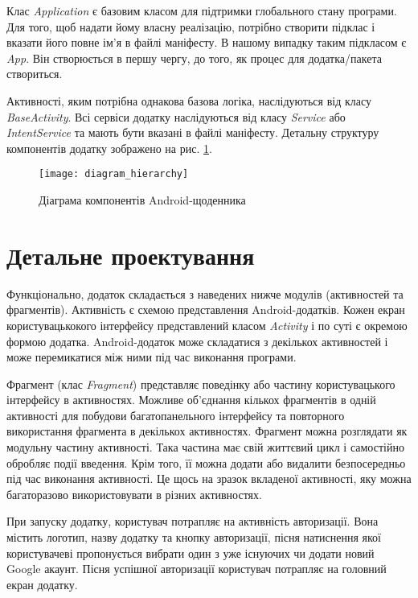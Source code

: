 \documentclass[../main.tex]{subfiles}
\begin{document}
Клас \textit{Application} є базовим класом для підтримки глобального стану програми. Для того, щоб надати йому власну реалізацію, потрібно створити підклас і вказати його повне ім'я в файлі маніфесту. В нашому випадку таким підкласом є \textit{App}. Він створюється в першу чергу, до того, як процес для додатка/пакета створиться.

Активності, яким потрібна однакова базова логіка, наслідуються від класу \textit{BaseActivity}. Всі сервіси додатку наслідуються від класу \textit{Service} або \textit{IntentService} та мають бути вказані в файлі маніфесту. Детальну структуру компонентів додатку зображено на рис. \ref{diagram:hierarchy}.

\begin{figure}[H]
	\centering
	\texttt{[image: diagram\_hierarchy]}
	\caption{Діаграма компонентів Android-щоденника}
	\label{diagram:hierarchy}
\end{figure}

\section{Детальне проектування}

Функціонально, додаток складається з наведених нижче модулів (активностей та фрагментів). Активність є схемою представлення Android-додатків. Кожен екран користувацькокого інтерфейсу представлений класом \textit{Activity} і по суті є окремою формою додатка. Android-додаток може складатися з декількох активностей і може перемикатися між ними під час виконання програми. 

Фрагмент (клас \textit{Fragment}) представляє поведінку або частину користувацького інтерфейсу в активностях. Можливе об'єднання кількох фрагментів в одній активності для побудови багатопанельного інтерфейсу та повторного використання фрагмента в декількох активностях. Фрагмент можна розглядати як модульну частину активності. Така частина має свій життєвий цикл і самостійно обробляє події введення. Крім того, її можна додати або видалити безпосередньо під час виконання активності. Це щось на зразок вкладеної активності, яку можна багаторазово використовувати в різних активностях.

При запуску додатку, користувач потрапляє на активність авторизації. Вона містить логотип, назву додатку та кнопку авторизації, пісня натиснення якої  користувачеві пропонується вибрати один з уже існуючих чи додати новий Google акаунт. Пісня успішної авторизації користувач потрапляє на головний екран додатку.
\end{document}
